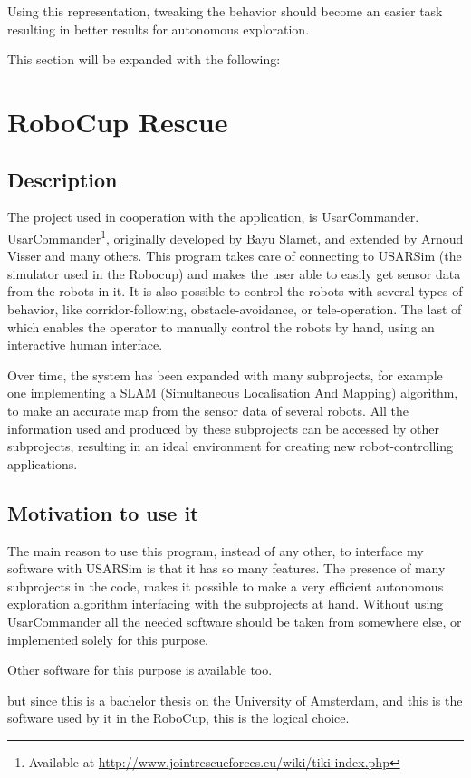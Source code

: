 \documentclass[a4paper,10pt]{article}
\begin{document}
Using this representation, tweaking the behavior should become an easier task
resulting in better results for autonomous exploration.

This section will be expanded with the following: 

\section{RoboCup Rescue}
\subsection{Description}
The project used in cooperation with the application, is UsarCommander.
UsarCommander\footnote{Available at
\url{http://www.jointrescueforces.eu/wiki/tiki-index.php}}, originally developed by Bayu Slamet, and extended by Arnoud
Visser and many others. This program takes care of connecting to USARSim (the
simulator used in the Robocup) and
makes the user able to easily get sensor data from the robots in it. It is also
possible to control the robots with several types of behavior, like
corridor-following, obstacle-avoidance, or tele-operation. The last of which
enables the operator to manually control the robots by hand, using an
interactive human interface.

Over time, the system has been expanded with many subprojects, for example one
implementing a SLAM
(Simultaneous Localisation And Mapping) algorithm, to make an accurate map from
the sensor data of several robots\cite{slamet2006manifoldslam}. All the information used and produced by
these subprojects can be accessed by other subprojects, resulting in an ideal
environment for creating new robot-controlling applications.

\subsection{Motivation to use it}
The main reason to use this program, instead of any other, to interface my
software with USARSim is that it has so many features. The presence of many
subprojects in the code, makes it possible to make a very efficient autonomous
exploration algorithm interfacing with the subprojects at hand. Without using UsarCommander all
the needed software should be taken from somewhere else, or implemented solely
for this purpose.

Other software for this purpose is available too. %

but since this is a bachelor
thesis on the University of Amsterdam, and this is the software used by it in
the RoboCup, this is the logical choice.
\end{document}
